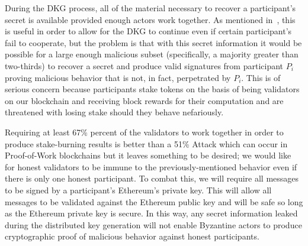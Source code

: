 During the DKG process, all of the material necessary
to recover a participant's secret is available provided
enough actors work together.
As mentioned in~\cite{ethdkg}, this is useful in order to allow
for the DKG to continue even if certain participant's fail to cooperate,
but the problem is that with this secret information it would
be possible for a large enough malicious subset (specifically,
a majority greater than two-thirds) to recover a secret
and produce valid signatures from participant $P_{i}$
proving malicious behavior that is not, in fact, perpetrated by $P_{i}$.
This is of serious concern because participants
stake tokens on the basis of being validators
on our blockchain and receiving block rewards for their computation
and are threatened with losing stake should they
behave nefariously.

Requiring at least 67\% percent of the validators to work together
in order to produce stake-burning results is
better than a 51\% Attack which can occur
in Proof-of-Work blockchains but it leaves something to be desired;
we would like for honest validators to be immune to
the previously-mentioned behavior even if there is only
one honest participant.
To combat this, we will require all messages to be signed
by a participant's Ethereum's private key.
This will allow all messages to be validated against the Ethereum
public key and will be safe so long as the Ethereum private key
is secure.
In this way, any secret information leaked during the distributed
key generation will not enable Byzantine actors to produce
cryptographic proof of malicious behavior against honest participants.

